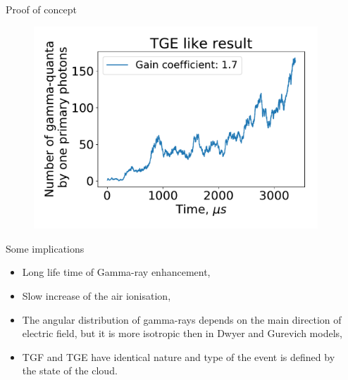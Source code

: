 \documentclass[final,hyperref={pdfpagelabels=false}]{beamer}
\begin{document}
\begin{frame}{}
\begin{columns}[t]
\begin{column}{0.32\linewidth}
\begin{block}{Proof of concept}
\begin{figure}[htb]
                        \includegraphics[width=1\columnwidth]{proofTGE.pdf}
                    \end{figure}
                \end{block}
                
                \begin{block}{Some implications}  \justifying
                    \begin{itemize}
                        \item Long life time of Gamma-ray enhancement,
                        \item Slow increase of the air ionisation,
                        \item The angular distribution of gamma-rays depends on the main direction of electric field, but it is more isotropic then in Dwyer and Gurevich models,
                        \item TGF and TGE have identical nature and type of the event is defined by the state of the cloud.
                        
                    \end{itemize}
                \end{block}
                
            \end{column}%
            
            \begin{column}{0.32\linewidth}
                

\end{column}
\end{columns}
\end{frame}
\end{document}
